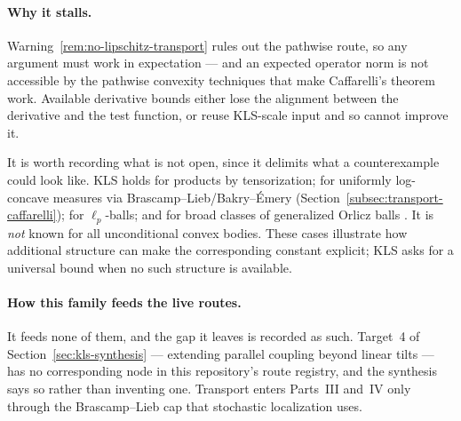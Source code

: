 \documentclass[../../main.tex]{subfiles}
\begin{document}
\paragraph{Why it stalls.}
Warning~\ref{rem:no-lipschitz-transport} rules out the pathwise route, so any argument must work
in expectation --- and an expected operator norm is not accessible by the pathwise convexity
techniques that make Caffarelli's theorem work. Available derivative bounds either lose the
alignment between the derivative and the test function, or reuse KLS-scale input and so cannot
improve it.

\begin{remark}
\label{rem:known-cases}
It is worth recording what is not open, since it delimits what a counterexample could look like.
KLS holds for products by tensorization; for uniformly log-concave measures via
Brascamp--Lieb/Bakry--\'Emery (Section~\ref{subsec:transport-caffarelli}); for $\ell_p$-balls; and
for broad classes of generalized Orlicz balls \cite{KolesnikovMilman2016OrliczKLS}. It is
\emph{not} known for all unconditional convex bodies. These cases illustrate how additional
structure can make the corresponding constant explicit; KLS asks for a universal bound when no
such structure is available.
\end{remark}

\paragraph{How this family feeds the live routes.}
It feeds none of them, and the gap it leaves is recorded as such. Target~4 of
Section~\ref{sec:kls-synthesis} --- extending parallel coupling beyond linear tilts --- has no
corresponding node in this repository's route registry, and the synthesis says so rather than
inventing one. Transport enters Parts~III and~IV only through the Brascamp--Lieb cap that
stochastic localization uses.
\end{document}
